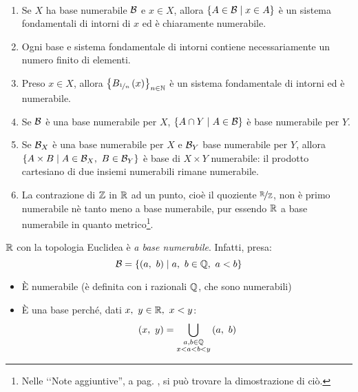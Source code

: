 \begin{demonstration}~{}
\begin{enumerate}[label=\Roman*]
	\item Se $X$ ha base numerabile $\mathcal{B}$ e $x\in X$, allora $\left\{A\in \mathcal{B}\mid x\in A\right\}$ è un sistema fondamentali di intorni di $x$ ed è chiaramente numerabile.
	\item Ogni base e sistema fondamentale di intorni contiene necessariamente un numero finito di elementi.
	\item Preso $x\in X$, allora $\left\{B_{\nicefrac{1}{n}}\left(x\right)\right\}_{n\in\mathbb{N}}$ è un sistema fondamentale di intorni ed è numerabile.
	\item Se $\mathcal{B}$ è una base numerabile per $X$, $\left\{A\cap Y\mid A\in \mathcal{B}\right\}$ è base numerabile per $Y$.
	\item Se $\mathcal{B}_X$ è una base numerabile per $X$ e $\mathcal{B}_Y$ base numerabile per $Y$, allora $\left\{A\times B\mid A\in \basis_X,\ B\in\basis_Y\right\}$ è base di $X\times Y$ numerabile: il prodotto cartesiano di due insiemi numerabili rimane numerabile.
	\item La contrazione di $\mathbb{Z}$ in $\mathbb{R}$ ad un punto, cioè il quoziente $\nicefrac{\mathbb{R}}{\mathbb{Z}}$, non è primo numerabile nè tanto meno a base numerabile, pur essendo $\mathbb{R}$ a base numerabile in quanto metrico\footnote{Nelle ‘‘Note aggiuntive'', a pag. \pageref{dimostrazionenonnumerabilità}, si può trovare la dimostrazione di ciò.}.
\end{enumerate}
\vspace{-3mm}
\end{demonstration}
\begin{example}
	$\mathbb{R}$ con la topologia Euclidea è \textit{a base numerabile}. Infatti, presa:
	\begin{equation*}
		\mathcal{B}=\left\{\left(a,\ b\right)\mid a,\ b\in \mathbb{Q},\ a<b\right\}
	\end{equation*}
	\begin{itemize}
		\item È numerabile (è definita con i razionali $\mathbb{Q}$, che sono numerabili)
		\item È una base perché, dati $x,\ y\in\realset,\ x<y$:
		\begin{equation*}
			\left(x,\ y\right)=\union_{\substack{a, b\in\rationalset\\x<a<b<y}}\left(a,\ b\right)
		\end{equation*}
	\end{itemize}
\vspace{-6mm}
\end{example}
